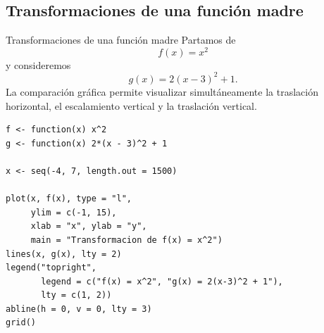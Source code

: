\documentclass[aspectratio=169,10pt]{beamer}
\begin{document}
\subsection*{Transformaciones de una función madre}
\begin{frame}{Transformaciones de una función madre}
Partamos de
\[
f(x)=x^2
\]
y consideremos
\[
g(x)=2(x-3)^2+1.
\]
La comparación gráfica permite visualizar simultáneamente la traslación
horizontal, el escalamiento vertical y la traslación vertical.

\begin{center}
\end{center}

\begin{verbatim}
f <- function(x) x^2
g <- function(x) 2*(x - 3)^2 + 1

x <- seq(-4, 7, length.out = 1500)

plot(x, f(x), type = "l",
     ylim = c(-1, 15),
     xlab = "x", ylab = "y",
     main = "Transformacion de f(x) = x^2")
lines(x, g(x), lty = 2)
legend("topright",
       legend = c("f(x) = x^2", "g(x) = 2(x-3)^2 + 1"),
       lty = c(1, 2))
abline(h = 0, v = 0, lty = 3)
grid()
\end{verbatim}

\end{frame}
\end{document}
